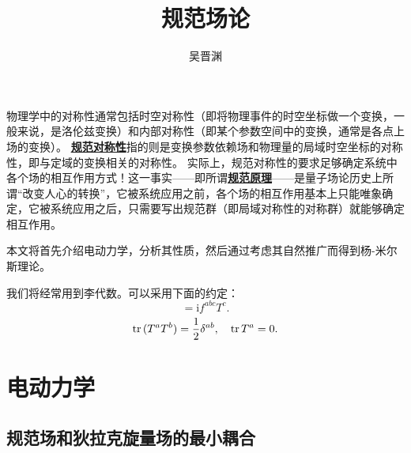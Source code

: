 \documentclass[hyperref, UTF8, a4paper]{ctexart}
\title{规范场论}
\author{吴晋渊}
\newcommand*{\ii}{\mathrm{i}}
\newcommand{\concept}[1]{\underline{\textbf{#1}}}
\begin{document}
\maketitle

物理学中的对称性通常包括时空对称性（即将物理事件的时空坐标做一个变换，一般来说，是洛伦兹变换）和内部对称性（即某个参数空间中的变换，通常是各点上场的变换）。
\concept{规范对称性}指的则是变换参数依赖场和物理量的局域时空坐标的对称性，即与定域的变换相关的对称性。
实际上，规范对称性的要求足够确定系统中各个场的相互作用方式！这一事实——即所谓\concept{规范原理}——是量子场论历史上所谓“改变人心的转换”，它被系统应用之前，各个场的相互作用基本上只能唯象确定，它被系统应用之后，只需要写出规范群（即局域对称性的对称群）就能够确定相互作用。

本文将首先介绍电动力学，分析其性质，然后通过考虑其自然推广而得到杨-米尔斯理论。

我们将经常用到李代数。可以采用下面的约定： %
\begin{equation}
    [T^a, T^b] = \ii f^{abc} T^c.
\end{equation}
\begin{equation}
    \trace{(T^a T^b)} = \frac{1}{2} \delta^{ab}, \quad \trace{T^a} = 0.
\end{equation}

\section{电动力学}

\subsection{规范场和狄拉克旋量场的最小耦合}
\end{document}
